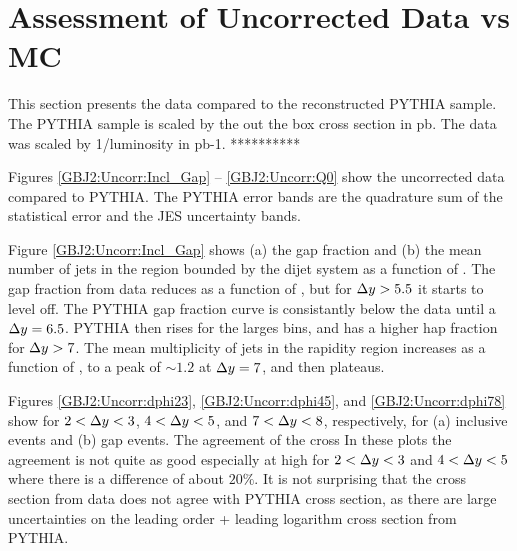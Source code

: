 \section{Assessment of Uncorrected Data vs MC}
\label{sec:GBJ2:Uncorr}
This section presents the data compared to the reconstructed PYTHIA sample.
The PYTHIA sample is scaled by the out the box cross section in pb. 
The data was scaled by 1/luminosity in pb-1. **********

Figures \ref{GBJ2:Uncorr:Incl_Gap} -- \ref{GBJ2:Uncorr:Q0} show the uncorrected data compared to PYTHIA.
The PYTHIA error bands are the quadrature sum of the statistical error and the JES uncertainty bands. 

Figure \ref{GBJ2:Uncorr:Incl_Gap} shows (a) the gap fraction and (b) the mean number of jets in the region bounded by the dijet system as a function of \dy{}.
The gap fraction from data reduces as a function of \dy{}, but for $\mbox{$\Delta y$}{}>5.5$ it starts to level off.
The PYTHIA gap fraction curve is consistantly below the data until a $\mbox{$\Delta y$}{}=6.5$.
PYTHIA then rises for the larges \dy{} bins, and has a higher hap fraction for $\mbox{$\Delta y$}{}>7$. 
The mean multiplicity of jets in the rapidity region increases as a function of \dy{}, to a peak of $\sim1.2$ at $\mbox{$\Delta y$}{}=7$, and then plateaus.


Figures \ref{GBJ2:Uncorr:dphi23}, \ref{GBJ2:Uncorr:dphi45}, and \ref{GBJ2:Uncorr:dphi78} show \dphiDist{} for $2<\mbox{$\Delta y$}{}<3$, $4<\mbox{$\Delta y$}{}<5$, and $7<\mbox{$\Delta y$}{}<8$,  respectively, for (a) inclusive events and (b) gap events.
The agreement of the cross
In these \dphi{} plots the agreement is not quite as good especially at high \dphi{} for  $2<\mbox{$\Delta y$}{}<3$ and $4<\mbox{$\Delta y$}{}<5$ where there is a difference of about $20\%$. 
It is not surprising that the cross section from data does not agree with PYTHIA cross section, as there are large uncertainties on the leading order + leading logarithm cross section from PYTHIA.

